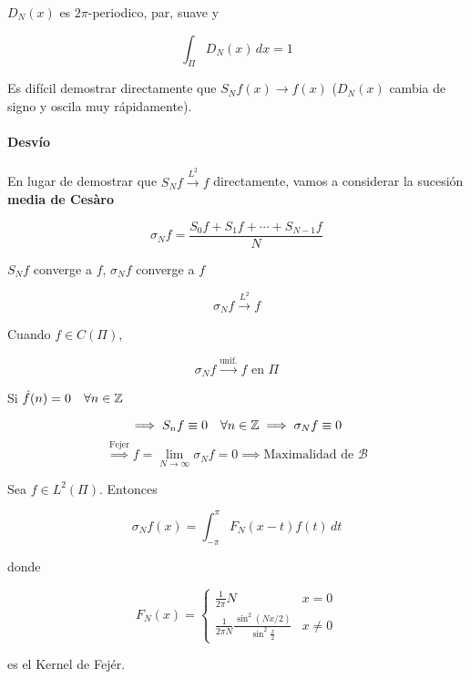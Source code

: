 \begin{fnote}
    $D_N(x)$ es $2\pi$-periodico, par, suave y 

    \[\int_\Pi D_N(x)\,dx=1\]


    Es difícil demostrar directamente que $S_N f(x)\to f(x)$ ($D_N(x)$ cambia de signo y oscila muy rápidamente). 
\end{fnote}

\paragraph{Desvío} En lugar de demostrar que $S_N f\xrightarrow{L^2}f$ directamente, vamos a considerar la sucesión \textbf{media de Cesàro}

\[\sigma_N f=\frac{S_0 f+S_1 f+\cdots + S_{N-1}f}{N}\]

\begin{fnote}
    $S_N f$ converge a $f$, $\sigma_N f$ converge a $f$
\end{fnote}

\begin{ftheorem}[Fejér]
    \[\sigma_N f\xrightarrow{L^2} f\]

    Cuando $f\in C(\Pi)$, 

    \[\sigma_N f\xrightarrow{\text{unif.}} f\text{ en }\Pi\]
\end{ftheorem}

Si $\hat f(n)=0\quad\forall n\in\mathbb{Z}$

\[\implies S_n f \equiv 0\quad \forall n\in\mathbb{Z}\implies \sigma_N f\equiv 0\]
\[\overset{\text{Fejer}}{\implies} f=\lim_{N\to\infty}\sigma_N f=0\implies \text{Maximalidad de }\mathcal{B}\]

\begin{fproposition}
    Sea $f\in L^2(\Pi)$. Entonces 

    \[\sigma_N f(x)=\int_{-\pi}^\pi F_N(x-t)f(t)\,dt\]

    donde 

    \[F_N(x)=\begin{cases}
        \frac{1}{2\pi}N & x=0\\
        \frac{1}{2\pi N} \frac{\sin^2(Nx/2)}{\sin^2 \frac{x}{2}}& x\neq 0
    \end{cases}\]

    es el Kernel de Fejér.
\end{fproposition}

